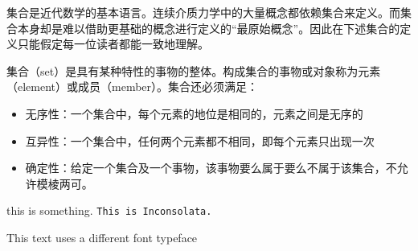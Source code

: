 \documentclass[main.tex]{subfiles}
\begin{document}
集合是近代数学的基本语言。连续介质力学中的大量概念都依赖集合来定义。而集合本身却是难以借助更基础的概念进行定义的“最原始概念”。因此在下述集合的定义只能假定每一位读者都能一致地理解。
\begin{definition}[集合]\label{def:II.1.1}
集合（set）是具有某种特性的事物的整体。构成集合的事物或对象称为元素（element）或成员（member）。集合还必须满足：
\begin{itemize}
    \item 无序性：一个集合中，每个元素的地位是相同的，元素之间是无序的
    \item 互异性：一个集合中，任何两个元素都不相同，即每个元素只出现一次
    \item 确定性：给定一个集合及一个事物，该事物要么属于要么不属于该集合，不允许模棱两可。
\end{itemize}
\end{definition}


this is something.
\texttt{This is Inconsolata.}

{\selectfont
	This text uses a different font typeface
}
\end{document}
